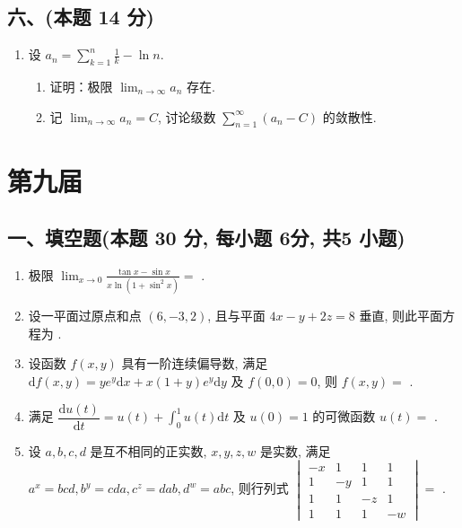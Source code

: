 \subsection*{六、(本题 14 分)}
\begin{enumerate}[start=10]
    \item 设 $a_n = \displaystyle\sum_{k=1}^{n} \frac{1}{k} - \ln n$.
          \begin{enumerate}
              \item[(1)] 证明：极限 $\displaystyle\lim_{n \to \infty} a_n$ 存在.
              \item[(2)] 记 $\displaystyle\lim_{n \to \infty} a_n = C$, 讨论级数 $\displaystyle\sum_{n=1}^{\infty} (a_n - C)$ 的敛散性.
          \end{enumerate}
\end{enumerate}


\newpage
\section{第九届}

\subsection*{一、填空题(本题 30 分,  每小题 6分,  共5 小题)}
\begin{enumerate}
    \item 极限 $\displaystyle\lim_{x \to 0} \frac{\tan x - \sin x}{x \ln(1 + \sin^2 x)} =$ \underline{\quad \quad}.
    \item 设一平面过原点和点 $(6, -3, 2)$, 且与平面 $4x - y + 2z = 8$ 垂直, 则此平面方程为 \underline{\quad \quad}.
    \item 设函数 $f(x, y)$ 具有一阶连续偏导数, 满足 $\mathrm{d}f(x, y) = ye^y \mathrm{d}x + x(1 + y)e^y \mathrm{d}y$ 及 $f(0, 0) = 0$, 则 $f(x, y) =$ \underline{\quad \quad}.
    \item 满足 $\dfrac{\mathrm{d}u(t)}{\mathrm{d}t} = u(t) + \displaystyle\int_{0}^{1} u(t) \mathrm{d}t$ 及 $u(0) = 1$ 的可微函数 $u(t) =$ \underline{\quad \quad}.
    \item 设 $a, b, c, d$ 是互不相同的正实数, $x, y, z, w$ 是实数, 满足 $a^x = bcd, b^y = cda, c^z = dab, d^w = abc$, 则行列式
          $\begin{vmatrix}
                  -x & 1  & 1  & 1  \\
                  1  & -y & 1  & 1  \\
                  1  & 1  & -z & 1  \\
                  1  & 1  & 1  & -w
              \end{vmatrix}
              =$ \underline{\quad \quad}.
\end{enumerate}

